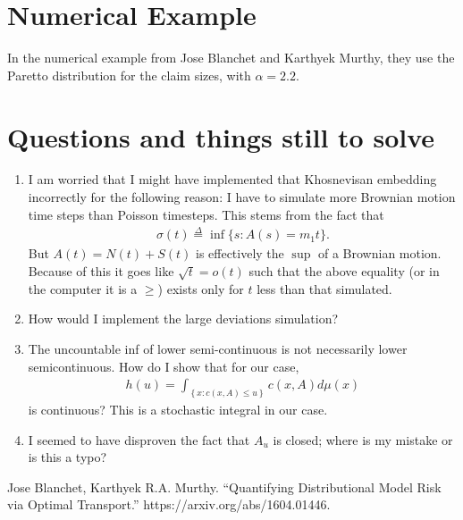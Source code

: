 \documentclass[12pt]{article}
\newcommand{\define}{\overset{\Delta}{=}}
\theoremstyle{definition}
\theoremstyle{definition}
\newtheorem{lemma}{Lemma}
\theoremstyle{definition}
\begin{document}



\section*{Numerical Example}
In the numerical example from Jose Blanchet and Karthyek Murthy, they use the Paretto distribution for the claim sizes, with $\alpha=2.2$. 


\section*{Questions and things still to solve}
\begin{enumerate}
\item I am worried that I might have implemented that Khosnevisan embedding incorrectly for the following reason: I have to simulate more Brownian motion time steps than Poisson timesteps. This stems from the fact that 
\begin{align*}
\sigma(t)\define\inf\{s: A(s)=m_1t\}.
\end{align*}
But $A(t)=N(t)+S(t)$ is effectively the $\sup$ of a Brownian motion. Because of this it goes like $\sqrt{t}=o(t)$ such that the above equality (or in the computer it is a $\geq$) exists only for $t$ less than that simulated.

\item How would I implement the large deviations simulation?

\item The uncountable inf of lower semi-continuous is not necessarily lower semicontinuous. How do I show that for our case,
\begin{align*}
h(u)=\int_{\left\{x:c(x,A)\leq u\right\}}^{}c(x,A)d\mu(x)
\end{align*}
is continuous? This is a stochastic integral in our case.
\item  I seemed to have disproven the fact that $A_u$ is closed; where is my mistake or is this a typo?

\end{enumerate}

\begin{thebibliography}{9}
 Jose Blanchet, Karthyek R.A. Murthy. ``Quantifying Distributional Model Risk via Optimal Transport.'' https://arxiv.org/abs/1604.01446.
\end{thebibliography}
\end{document}
